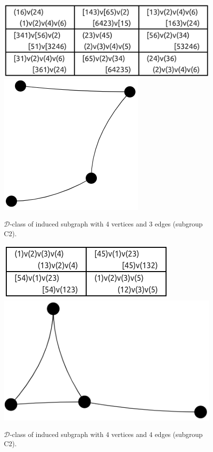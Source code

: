 \begin{appendices}
\begin{figure}[H]
\includegraphics[scale=0.08]{images/x1/x1_4v_3e_2.png}
\includegraphics[scale=0.2]{images/x1/x1_4v_3e_2_vis.png}
\caption{$\mathcal{D}$-class of induced subgraph with 4 vertices and 3 edges (subgroup C2).}
\end{figure}

\begin{figure}[H]
\includegraphics[scale=0.3]{images/x1/x1_4v_4e.png}
\includegraphics[scale=0.17]{images/x1/x1_4v_4e_vis.png}
\caption{$\mathcal{D}$-class of induced subgraph with 4 vertices and 4 edges (subgroup C2).}
\end{figure}


\end{appendices}
